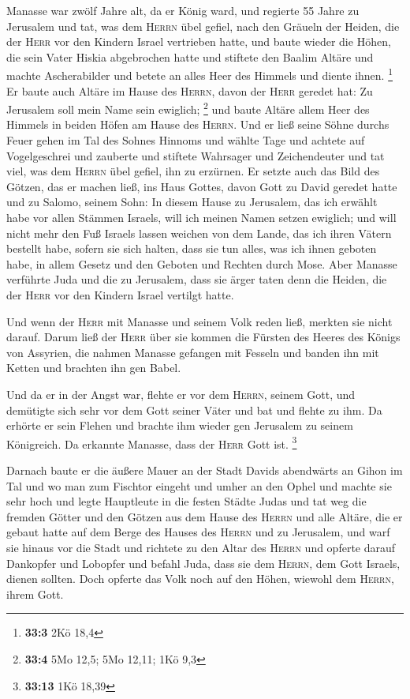  Manasse war zwölf Jahre alt, da er König ward, und
regierte 55 Jahre zu Jerusalem  und tat, was dem
\textsc{Herrn} übel gefiel, nach den Gräueln der Heiden, die der
\textsc{Herr} vor den Kindern Israel vertrieben hatte, 
und baute wieder die Höhen, die sein Vater Hiskia abgebrochen hatte und
stiftete den Baalim Altäre und machte Ascherabilder und betete an alles
Heer des Himmels und diente ihnen. \footnote{\textbf{33:3} 2Kö 18,4}
 Er baute auch Altäre im Hause des \textsc{Herrn}, davon
der \textsc{Herr} geredet hat: Zu Jerusalem soll mein Name sein
ewiglich; \footnote{\textbf{33:4} 5Mo 12,5; 5Mo 12,11; 1Kö 9,3}
 und baute Altäre allem Heer des Himmels in beiden Höfen
am Hause des \textsc{Herrn}.  Und er ließ seine Söhne
durchs Feuer gehen im Tal des Sohnes Hinnoms und wählte Tage und achtete
auf Vogelgeschrei und zauberte und stiftete Wahrsager und Zeichendeuter
und tat viel, was dem \textsc{Herrn} übel gefiel, ihn zu erzürnen.
 Er setzte auch das Bild des Götzen, das er machen ließ,
ins Haus Gottes, davon Gott zu David geredet hatte und zu Salomo, seinem
Sohn: In diesem Hause zu Jerusalem, das ich erwählt habe vor allen
Stämmen Israels, will ich meinen Namen setzen ewiglich; 
und will nicht mehr den Fuß Israels lassen weichen von dem Lande, das
ich ihren Vätern bestellt habe, sofern sie sich halten, dass sie tun
alles, was ich ihnen geboten habe, in allem Gesetz und den Geboten und
Rechten durch Mose.  Aber Manasse verführte Juda und die
zu Jerusalem, dass sie ärger taten denn die Heiden, die der
\textsc{Herr} vor den Kindern Israel vertilgt hatte.

 Und wenn der \textsc{Herr} mit Manasse und seinem Volk
reden ließ, merkten sie nicht darauf.  Darum ließ der
\textsc{Herr} über sie kommen die Fürsten des Heeres des Königs von
Assyrien, die nahmen Manasse gefangen mit Fesseln und banden ihn mit
Ketten und brachten ihn gen Babel.

 Und da er in der Angst war, flehte er vor dem
\textsc{Herrn}, seinem Gott, und demütigte sich sehr vor dem Gott seiner
Väter  und bat und flehte zu ihm. Da erhörte er sein
Flehen und brachte ihm wieder gen Jerusalem zu seinem Königreich. Da
erkannte Manasse, dass der \textsc{Herr} Gott ist. \footnote{\textbf{33:13}
  1Kö 18,39}

 Darnach baute er die äußere Mauer an der Stadt Davids
abendwärts an Gihon im Tal und wo man zum Fischtor eingeht und umher an
den Ophel und machte sie sehr hoch und legte Hauptleute in die festen
Städte Judas  und tat weg die fremden Götter und den
Götzen aus dem Hause des \textsc{Herrn} und alle Altäre, die er gebaut
hatte auf dem Berge des Hauses des \textsc{Herrn} und zu Jerusalem, und
warf sie hinaus vor die Stadt  und richtete zu den Altar
des \textsc{Herrn} und opferte darauf Dankopfer und Lobopfer und befahl
Juda, dass sie dem \textsc{Herrn}, dem Gott Israels, dienen sollten.
 Doch opferte das Volk noch auf den Höhen, wiewohl dem
\textsc{Herrn}, ihrem Gott.


